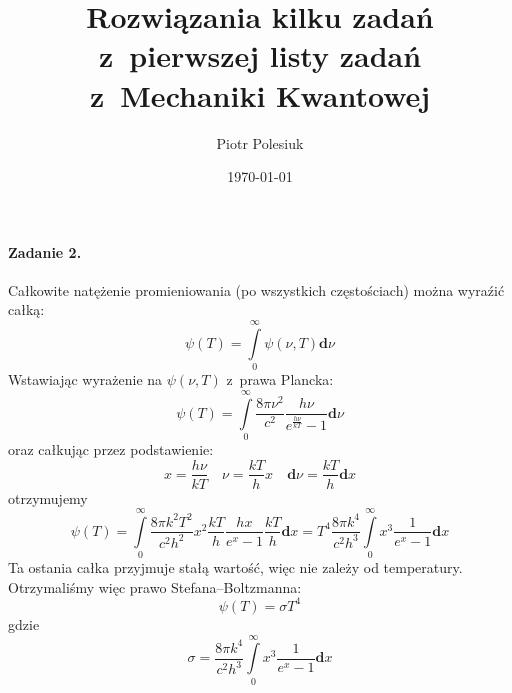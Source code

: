 \documentclass{article}
\title{Rozwiązania kilku zadań z~pierwszej listy zadań z~Mechaniki Kwantowej}
\author{Piotr Polesiuk}
\date{\today}
\newcommand*{\intd}{\mathrm{\textbf{d}}}
\begin{document}
\maketitle

\paragraph{Zadanie 2.}

Całkowite natężenie promieniowania (po wszystkich częstościach) można wyraźić 
całką:
\[
\psi(T) = \int\limits_0^\infty \psi(\nu, T) \intd\nu
\]
Wstawiając wyrażenie na $\psi(\nu, T)$ z~prawa Plancka:
\[
\psi(T) = \int\limits_0^\infty \frac{8\pi\nu^2}{c^2} 
	\frac{h\nu}{e^\frac{h\nu}{kT} - 1} \intd\nu
\]
oraz całkując przez podstawienie:
\[
x = \frac{h\nu}{kT}
\quad
\nu = \frac{kT}{h}x
\quad
\intd\nu = \frac{kT}{h}\intd x
\]
otrzymujemy
\[
\psi(T) 
= \int\limits_0^\infty \frac{8\pi k^2 T^2}{c^2 h^2}x^2
	\frac{kT}{h}\frac{hx}{e^x - 1}\frac{kT}{h}\intd x
= T^4\frac{8\pi k^4}{c^2 h^3}
	\int\limits_0^\infty x^3\frac{1}{e^x - 1}\intd x
\]
Ta ostania całka przyjmuje stałą wartość, więc nie zależy od temperatury.
Otrzymaliśmy więc prawo Stefana--Boltzmanna:
\[
\psi(T) = \sigma T^4
\]
gdzie
\[
\sigma = \frac{8\pi k^4}{c^2 h^3}
	\int\limits_0^\infty x^3\frac{1}{e^x - 1}\intd x
\]
\end{document}
